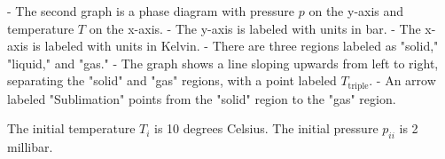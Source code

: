 - The second graph is a phase diagram with pressure \( p \) on the y-axis and temperature \( T \) on the x-axis.
- The y-axis is labeled with units in bar.
- The x-axis is labeled with units in Kelvin.
- There are three regions labeled as "solid," "liquid," and "gas."
- The graph shows a line sloping upwards from left to right, separating the "solid" and "gas" regions, with a point labeled \( T_{\text{triple}} \).
- An arrow labeled "Sublimation" points from the "solid" region to the "gas" region.

The initial temperature \( T_i \) is 10 degrees Celsius.
The initial pressure \( p_{ii} \) is 2 millibar.